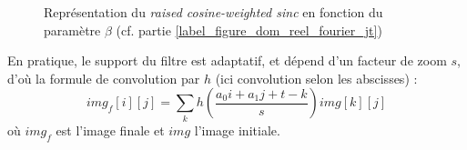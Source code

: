 	\begin{figure}
		\centering
		\caption{Représentation du \emph{raised cosine-weighted sinc} en fonction du paramètre $\beta$ (cf. partie \ref{label_figure_dom_reel_fourier_jt})}
		\label{szeliski_plotRaisedCosine}
	\end{figure}
	
	En pratique, le support du filtre est adaptatif, et dépend d'un facteur de zoom $s$, d'où la formule de convolution par $h$ (ici convolution selon les abscisses) :
	\begin{equation}
	img_f[i][j] = \displaystyle{\sum_k}h\left(\frac{a_0i+a_1j+t-k}{s}\right)img[k][j]
	\label{formule_convolution_discrete}
	\end{equation}
	où $img_f$ est l'image finale et $img$ l'image initiale.
	

